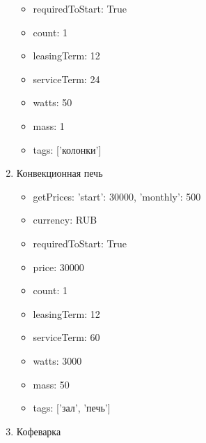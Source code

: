 \documentclass[a4paper,12pt]{article}
\begin{document}
\begin{enumerate}
\begin{itemize}
          \item requiredToStart: True
        
          \item count: 1
        
          \item leasingTerm: 12
        
          \item serviceTerm: 24
        
          \item watts: 50
        
          \item mass: 1
        
          \item tags: ['колонки']
        
        \end{itemize}
      
      \item Конвекционная печь
        \begin{itemize}
        
          \item getPrices: {'start': 30000, 'monthly': 500}
        
          \item currency: RUB
        
          \item requiredToStart: True
        
          \item price: 30000
        
          \item count: 1
        
          \item leasingTerm: 12
        
          \item serviceTerm: 60
        
          \item watts: 3000
        
          \item mass: 50
        
          \item tags: ['зал', 'печь']
        
        \end{itemize}
      
      \item Кофеварка
        \begin{itemize}
        

\end{itemize}
\end{enumerate}
\end{document}
